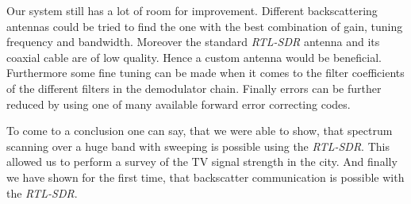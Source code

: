 \documentclass[conference]{IEEEtran}
\begin{document}
Our system still has a lot of room for improvement.  Different
backscattering antennas could be tried to find the one with the best
combination of gain, tuning frequency and bandwidth. Moreover the
standard \textit{RTL-SDR} antenna and its coaxial cable are of low
quality.  Hence a custom antenna would be beneficial. Furthermore some
fine tuning can be made when it comes to the filter coefficients of the
different filters in the demodulator chain. Finally  errors can be
further reduced by using one of many available forward error correcting
codes.

To come to a conclusion one can say, that we were able to show, that
spectrum scanning over a huge band with sweeping is possible using the
\textit{RTL-SDR}.  This allowed us to perform a survey of the TV signal
strength in the city. And finally we have shown for the first time, that
backscatter communication is possible with the \textit{RTL-SDR}.





\end{document}
